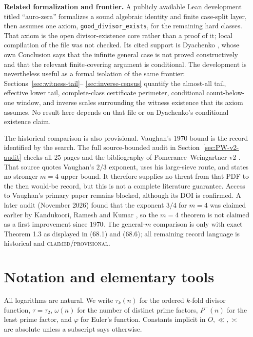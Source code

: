 \documentclass[10pt,reqno]{amsart}
\theoremstyle{definition}
\newcommand{\1}{\mathbf 1}
\begin{document}
\medskip\noindent\textbf{Related formalization and frontier.}
A publicly available Lean development titled ``auro-zera'' formalizes a
sound algebraic identity and finite case-split layer, then assumes one axiom,
\texttt{good\_divisor\_exists}, for the remaining hard classes.  That axiom
is the open divisor-existence core rather than a proof of it; local
compilation of the file was not checked.  Its cited support is Dyachenko
\cite{Dyachenko}, whose own Conclusion says that the infinite general case
is not proved constructively and that the relevant finite-covering argument
is conditional.  The development is nevertheless useful as a formal
isolation of the same frontier: Sections~\ref{sec:witness-tail}--
\ref{sec:inverse-census} quantify the almost-all tail, effective lower tail,
complete-class certificate perimeter, conditional count-below-one window,
and inverse scales surrounding the witness existence that its axiom
assumes.  No result here depends
on that file or on Dyachenko's conditional existence claim.

The historical comparison is also provisional.  Vaughan's 1970 bound
\cite{Vaughan} is the record identified by the search.  The full
source-bounded audit in Section~\ref{sec:PW-v2-audit} checks all $25$ pages
and the bibliography of Pomerance--Weingartner v2
\cite{PomeranceWeingartner}.  That source quotes Vaughan's $2/3$ exponent,
uses his large-sieve route, and states no stronger $m=4$ upper bound.  It
therefore supplies no threat from that PDF to the then would-be record, but this
is not a complete literature guarantee.  Access to Vaughan's primary paper
remains blocked, although its DOI is confirmed.  A later audit (November
2026) found that the exponent $3/4$ for $m=4$ was claimed earlier by
Kandukoori, Ramesh and Kumar \cite{KRK}, so the $m=4$ theorem is not
claimed as a first improvement since 1970.  The general-$m$ comparison is
only with exact Theorem 1.3 as displayed in (68.1) and (68.6); all remaining
record language is historical and \textsc{claimed/provisional}.

\section{Notation and elementary tools}\label{sec:notation}
All logarithms are natural.  We write $\tau_k(n)$ for the ordered $k$-fold divisor function, $\tau=\tau_2$, $\omega(n)$ for the number of distinct prime factors, $P^-(n)$ for the least prime factor, and $\varphi$ for Euler's function.  Constants implicit in $O,\ll,\asymp$ are absolute unless a subscript says otherwise.
\end{document}
